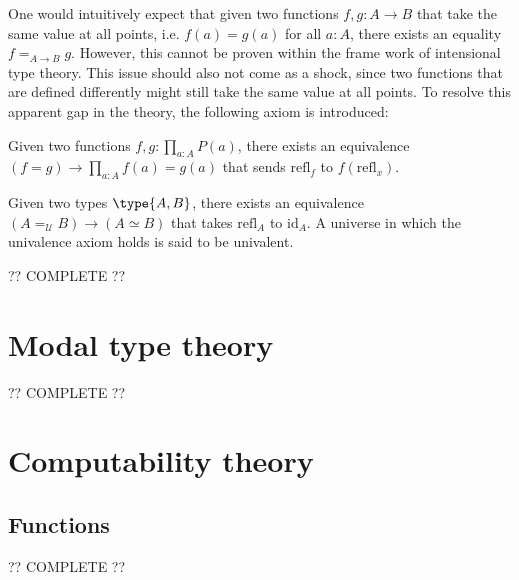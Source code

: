     One would intuitively expect that given two functions $f,g:A\rightarrow B$ that take the same value at all points, i.e. $f(a)=g(a)$ for all $a:A$, there exists an equality $f=_{A\rightarrow B}g$. However, this cannot be proven within the frame work of intensional type theory. This issue should also not come as a shock, since two functions that are defined differently might still take the same value at all points. To resolve this apparent gap in the theory, the following axiom is introduced:
    \begin{axiom}
        Given two functions $f,g:\prod_{a:A}P(a)$, there exists an equivalence $(f=g)\rightarrow\prod_{a:A}f(a)=g(a)$ that sends $\text{refl}_f$ to $f(\text{refl}_x)$.
    \end{axiom}
    \begin{axiom}
        Given two types $\type{A,B}$, there exists an equivalence $(A=_{\mathcal{U}}B)\rightarrow(A\simeq B)$ that takes $\text{refl}_A$ to $\text{id}_A$. A universe in which the univalence axiom holds is said to be univalent.
    \end{axiom}

    ?? COMPLETE ??

\section{Modal type theory}\label{section:modal_type_theory}

    ?? COMPLETE ??

\section{Computability theory}\label{section:turing}
\subsection{Functions}



    ?? COMPLETE ??